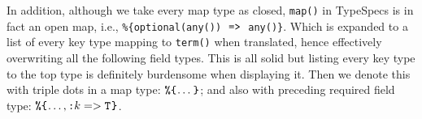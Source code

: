\documentclass{article}
\begin{document}
In addition, although we take every map type as closed, \texttt{map()} in TypeSpecs is in fact an open map, i.e., \texttt{\%\{optional(any())} $\;\texttt{=>}\;$ \texttt{any()\}}.
Which is expanded to a list of every key type mapping to \texttt{term()} when translated, hence effectively overwriting all the following field types.
This is all solid but listing every key type to the top type is definitely burdensome when displaying it.
Then we denote this with triple dots in a map type: $\texttt{\%\{}\hspace{.07em}\mbox{\ensuremath{\dots}}\hspace{.07em}\texttt{\}}$; and also with preceding required field type: $\texttt{\%\{}\hspace{.07em}\mbox{\ensuremath{\dots, \texttt{:$k$} => \texttt{T}}}\hspace{.07em}\texttt{\}}$.


\newpage








\end{document}
